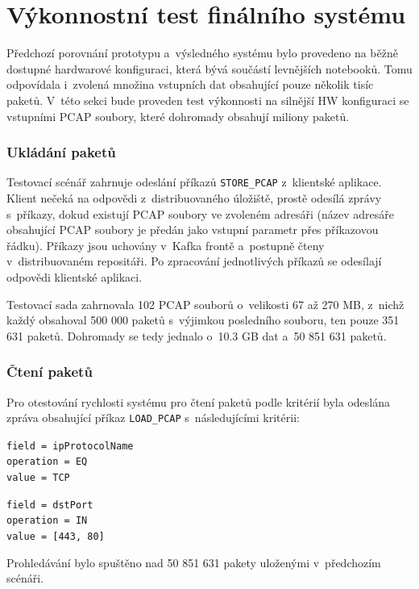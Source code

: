 \section{Výkonnostní test finálního systému}
Předchozí porovnání prototypu a~výsledného systému bylo provedeno na běžně dostupné hardwarové konfiguraci, která bývá součástí levnějších notebooků. Tomu odpovídala i~zvolená množina vstupních dat obsahující pouze několik tisíc paketů. V~této sekci bude proveden test výkonnosti na silnější HW konfiguraci se vstupními PCAP soubory, které dohromady obsahují miliony paketů.

\subsubsection{Ukládání paketů}
Testovací scénář zahrnuje odeslání příkazů \texttt{STORE\_PCAP} z~klientské aplikace. Klient nečeká na odpovědi z~distribuovaného úložiště, prostě odesílá zprávy s~příkazy, dokud existují PCAP soubory ve zvoleném adresáři (název adresáře obsahující PCAP soubory je předán jako vstupní parametr přes příkazovou řádku). Příkazy jsou uchovány v~Kafka frontě a~postupně čteny v~distribuovaném repositáři. Po zpracování jednotlivých příkazů se odesílají odpovědi klientské aplikaci.

Testovací sada zahrnovala 102 PCAP souborů o~velikosti 67 až 270 MB, z~nichž každý obsahoval 500 000 paketů s~výjimkou posledního souboru, ten pouze 351 631 paketů. Dohromady se tedy jednalo o~10.3 GB dat a~50 851 631 paketů.

\subsubsection{Čtení paketů}
Pro otestování rychlosti systému pro čtení paketů podle kritérií byla odeslána zpráva obsahující příkaz \texttt{LOAD\_PCAP} s~následujícími kritérii:

\vspace{0.5cm}
\texttt{field = ipProtocolName} \\
\indent \texttt{operation = EQ} \\
\indent \texttt{value = TCP}

\vspace{0.5cm}
\texttt{field = dstPort} \\
\indent \texttt{operation = IN} \\
\indent \texttt{value = [443, 80]}

\vspace{0.5cm}
\noindent Prohledávání bylo spuštěno nad 50 851 631 pakety uloženými v~předchozím scénáři.

